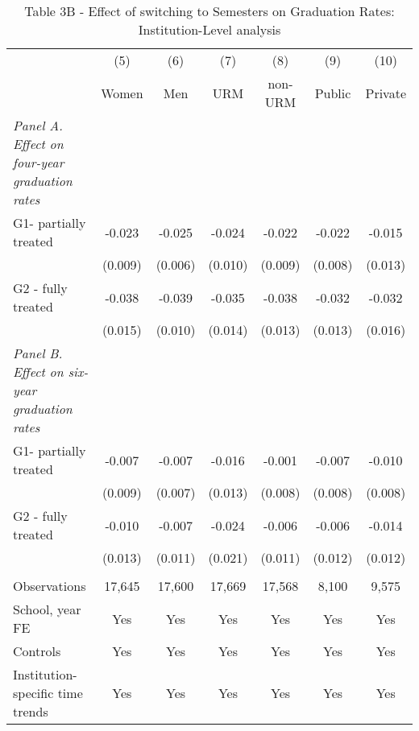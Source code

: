 \documentclass[8pt]{article}
\begin{document}
\begin{table}
\captionsetup{skip=0pt}
\captionsetup{font=footnotesize}
\caption*{Table 3B - Effect of switching to Semesters on Graduation Rates: Institution-Level analysis } 
\begin{tabular}{lcccccc} \hline
& (5) & (6) & (7) & (8) & (9) & (10) \\
& Women & Men & URM & non-URM & Public & Private \\ \hline
\textit{Panel A. Effect on four-year graduation rates}\\
G1- partially treated & -0.023 & -0.025 & -0.024 & -0.022 & -0.022 & -0.015 \\
& (0.009) & (0.006) & (0.010) & (0.009) & (0.008) & (0.013) \\
G2 - fully treated & -0.038 & -0.039 & -0.035 & -0.038 & -0.032 & -0.032 \\
& (0.015) & (0.010) & (0.014) & (0.013) & (0.013) & (0.016) \\
\textit{Panel B. Effect on six-year graduation rates}\\
G1- partially treated & -0.007 & -0.007 & -0.016 & -0.001 & -0.007 & -0.010 \\
 & (0.009) & (0.007) & (0.013) & (0.008) & (0.008) & (0.008) \\
G2 - fully treated & -0.010 & -0.007 & -0.024 & -0.006 & -0.006 & -0.014 \\
 & (0.013) & (0.011) & (0.021) & (0.011) & (0.012) & (0.012) \\
 &  &  &  &  &  &  \\
Observations & 17,645 & 17,600 & 17,669 & 17,568 & 8,100 & 9,575 \\
School, year FE & Yes & Yes & Yes & Yes & Yes & Yes \\
Controls & Yes & Yes & Yes & Yes & Yes & Yes \\
Institution-specific time trends & Yes & Yes & Yes & Yes & Yes & Yes \\ \hline
\end{tabular}
\end{table}
\end{document}
